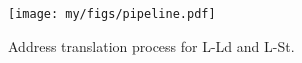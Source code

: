 









\begin{figure}[t]
  \centering
  \texttt{[image: my/figs/pipeline.pdf]}
  \caption{Address translation process for L-Ld and L-St. }
  \label{fig:pipeline}
\end{figure}

